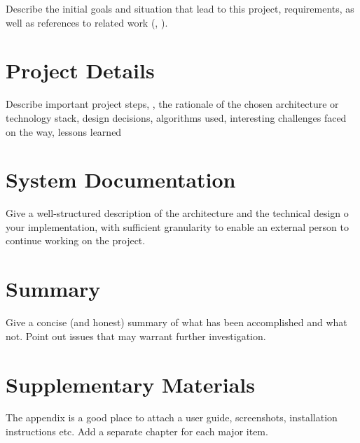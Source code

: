 \documentclass[notitlepage,english,smartquotes]{hgbreport}
\begin{document}
Describe the initial goals and situation that lead to this project, requirements, as well as
references to related work (\eg, \cite{Higham1998}).



\chapter{Project Details}

Describe important project steps, \eg, the rationale of the chosen architecture or technology stack, 
design decisions, algorithms used, interesting challenges faced on the way, lessons 
learned \etc


\chapter{System Documentation}

Give a well-structured description of the architecture and the technical design
o your implementation,
with sufficient granularity to enable an external person to
continue working on the project.


\chapter{Summary}

Give a concise (and honest) summary of what has been accomplished and what not. 
Point out issues that may warrant further investigation.


\appendix %


\chapter{Supplementary Materials}

The appendix is a good place to attach a user guide, screenshots, installation instructions etc.
Add a separate chapter for each major item.


\MakeBibliography[nosplit]
\end{document}

